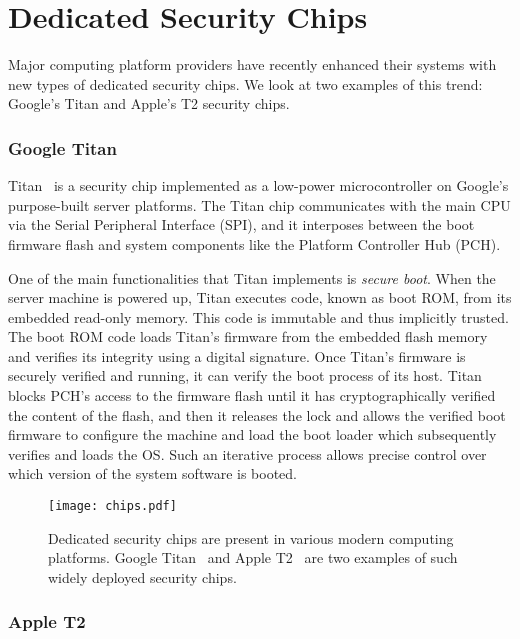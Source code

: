 \section*{Dedicated Security Chips}

Major computing platform providers have recently enhanced their systems with new types of dedicated security chips. We look at two examples of this trend: Google's Titan and Apple's T2 security chips.

\subsubsection*{Google Titan}

Titan~\cite{titan} is a security chip implemented as a low-power microcontroller on Google's purpose-built server platforms. The Titan chip communicates with the main CPU via the Serial Peripheral Interface (SPI), and it interposes between the boot firmware flash and system components like the Platform Controller Hub (PCH).

 One of the main functionalities that Titan implements is \emph{secure boot}. When the server machine is powered up, Titan executes code, known as boot ROM, from its embedded read-only memory. This code is immutable and thus implicitly trusted. The boot ROM code loads Titan's firmware from the embedded flash memory and verifies its integrity using a digital signature. Once Titan's firmware is securely verified and running, it can verify the boot process of its host. Titan blocks PCH's access to the firmware flash until it has cryptographically verified the content of the flash, and then it releases the lock and allows the verified boot firmware to configure the machine and load the boot loader which subsequently verifies and loads the OS. Such an iterative process allows precise control over which version of the system software is booted. 

\begin{figure}[t]
    \centering
    \texttt{[image: chips.pdf]}
    \caption{Dedicated security chips are present in various modern computing platforms. Google Titan~\cite{titan} and Apple T2~\cite{t2} are two examples  of such widely deployed security chips.}
\label{fig:prototype}   
\end{figure}

 
\subsubsection*{Apple T2}
 
